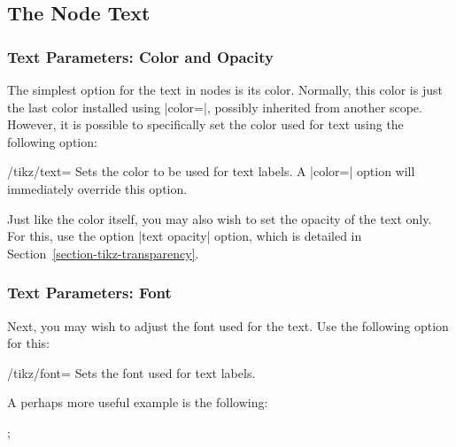 \subsection{The Node Text}

\label{section-nodes-options}

\subsubsection{Text Parameters: Color and Opacity}

The simplest option for the text in nodes is its color. Normally, this
color is just the last color installed using |color=|, possibly
inherited from another scope. However, it is possible to specifically
set the color used for text using the following option:

\begin{key}{/tikz/text=}
  Sets the color to be used for text labels. A |color=| option
  will immediately override this option.
\begin{codeexample}[]
\end{codeexample}
\end{key}

Just like the color itself, you may also wish to set the opacity of
the text only. For this, use the option |text opacity| option, which
is detailed in Section~\ref{section-tikz-transparency}.

\subsubsection{Text Parameters: Font}

Next, you may wish to adjust the font used for the text. Use the
following option for this:
\begin{key}{/tikz/font=}
  Sets the font used for text labels.
\begin{codeexample}[]
\end{codeexample}
  A perhaps more useful example is the following:

\begin{codeexample}[]
\tikz [every text node part/.style={font=\itshape},
       every lower node part/.style={font=\footnotesize}]
  ;
\end{codeexample}
\end{key}



